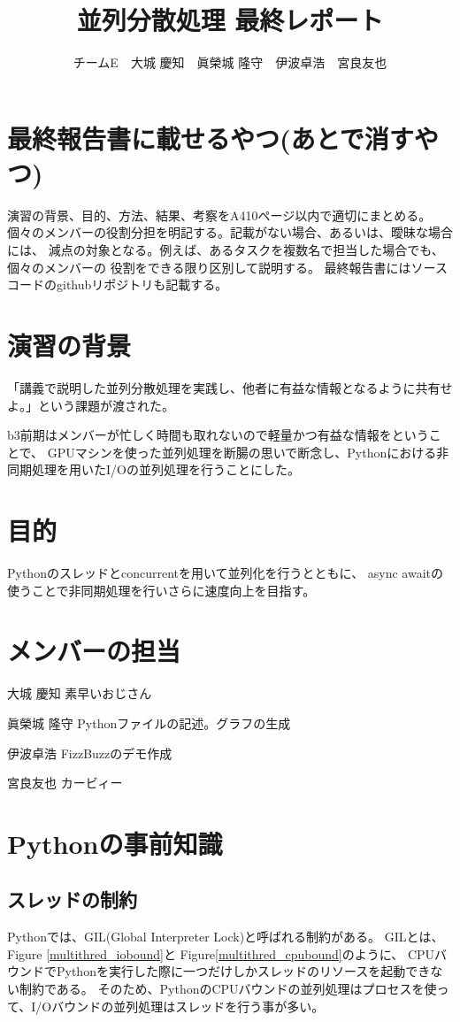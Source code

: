 \documentclass[14pt, oneside]{article}     	%
\title{並列分散処理  最終レポート}
\author{チームE　大城 慶知　眞榮城 隆守　伊波卓浩　宮良友也}
\begin{document}
\maketitle

\section*{最終報告書に載せるやつ(あとで消すやつ)}

演習の背景、目的、方法、結果、考察をA410ページ以内で適切にまとめる。
個々のメンバーの役割分担を明記する。記載がない場合、あるいは、曖昧な場合には、
減点の対象となる。例えば、あるタスクを複数名で担当した場合でも、個々のメンバーの
役割をできる限り区別して説明する。
最終報告書にはソースコードのgithubリポジトリも記載する。

\section{演習の背景}
「講義で説明した並列分散処理を実践し、他者に有益な情報となるように共有せよ。」という課題が渡された。

b3前期はメンバーが忙しく時間も取れないので軽量かつ有益な情報をということで、
GPUマシンを使った並列処理を断腸の思いで断念し、Pythonにおける非同期処理を用いたI/Oの並列処理を行うことにした。

\section{目的}
Pythonのスレッドとconcurrentを用いて並列化を行うとともに、
async awaitの使うことで非同期処理を行いさらに速度向上を目指す。

\section{メンバーの担当}

大城 慶知 素早いおじさん

眞榮城 隆守 Pythonファイルの記述。グラフの生成

伊波卓浩 FizzBuzzのデモ作成

宮良友也 カービィー

\section{Pythonの事前知識}

\subsection{スレッドの制約}
Pythonでは、GIL(Global Interpreter Lock)と呼ばれる制約がある。
GILとは、Figure \ref{multithred_iobound}と Figure\ref{multithred_cpubound}のように、
CPUバウンドでPythonを実行した際に一つだけしかスレッドのリソースを起動できない制約である。
そのため、PythonのCPUバウンドの並列処理はプロセスを使って、I/Oバウンドの並列処理はスレッドを行う事が多い。
\end{document}

